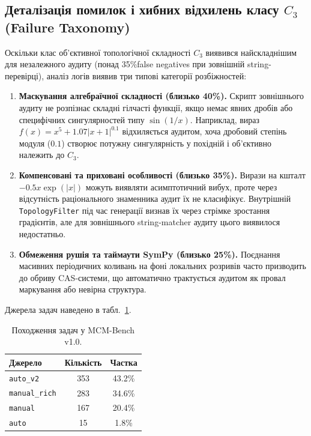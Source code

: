 \documentclass[11pt]{article}
\begin{document}
\subsection{Деталізація помилок і хибних відхилень класу $C_3$ (Failure Taxonomy)}

Оскільки клас об'єктивної топологічної складності $C_3$ виявився найскладнішим для незалежного аудиту (понад 35\%false negatives при зовнішній string-перевірці), аналіз логів виявив три типові категорії розбіжностей:
\begin{enumerate}[leftmargin=1.5em]
  \item \textbf{Маскування алгебраїчної складності (близько 40\%).} Скрипт зовнішнього аудиту не розпізнає складні гілчасті функції, якщо немає явних дробів або специфічних сингулярностей типу $\sin(1/x)$. Наприклад, вираз $f(x) = x^5 + 1.07|x+1|^{0.1}$ відхиляється аудитом, хоча дробовий степінь модуля ($0.1$) створює потужну сингулярність у похідній і об'єктивно належить до $C_3$.
  \item \textbf{Компенсовані та приховані особливості (близько 35\%).} Вирази на кшталт $-0.5x \exp(|x|)$ можуть виявляти асимптотичний вибух, проте через відсутність раціонального знаменника аудит їх не класифікує. Внутрішній \texttt{TopologyFilter} під час генерації визнав їх через стрімке зростання градієнтів, але для зовнішнього string-matcher аудиту цього виявилося недостатньо.
  \item \textbf{Обмеження рушія та таймаути SymPy (близько 25\%).} Поєднання масивних періодичних коливань на фоні локальних розривів часто призводить до обриву CAS-системи, що автоматично трактується аудитом як провал маркування або невірна структура.
\end{enumerate}

Джерела задач наведено в табл.~\ref{tab:task_sources}.

\begin{table}[h]
\centering
\begin{tabular}{lcc}
\toprule
\textbf{Джерело} & \textbf{Кількість} & \textbf{Частка} \\
\midrule
\texttt{auto\_v2} & 353 & 43.2\% \\
\texttt{manual\_rich} & 283 & 34.6\% \\
\texttt{manual} & 167 & 20.4\% \\
\texttt{auto} & 15 & 1.8\% \\
\bottomrule
\end{tabular}
\caption{Походження задач у MCM-Bench v1.0.}
\label{tab:task_sources}
\end{table}
\end{document}
